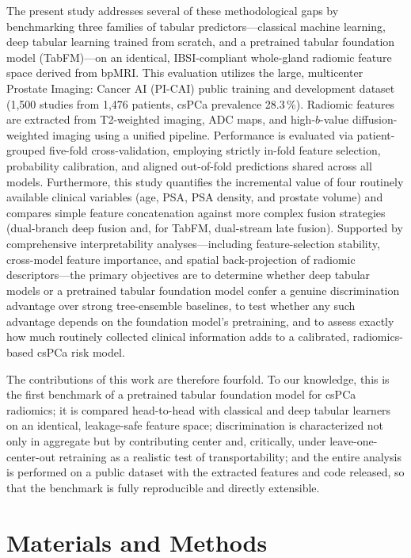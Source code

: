 \documentclass[11pt]{article}
\begin{document}
The present study addresses several of these methodological gaps by benchmarking three families of tabular predictors---classical machine learning, deep tabular learning trained from scratch, and a pretrained tabular foundation model (TabFM)---on an identical, IBSI-compliant whole-gland radiomic feature space derived from bpMRI. This evaluation utilizes the large, multicenter Prostate Imaging: Cancer AI (PI-CAI) public training and development dataset (1{,}500 studies from 1{,}476 patients, csPCa prevalence 28.3\,\%). Radiomic features are extracted from T2-weighted imaging, ADC maps, and high-$b$-value diffusion-weighted imaging using a unified pipeline. Performance is evaluated via patient-grouped five-fold cross-validation, employing strictly in-fold feature selection, probability calibration, and aligned out-of-fold predictions shared across all models. Furthermore, this study quantifies the incremental value of four routinely available clinical variables (age, PSA, PSA density, and prostate volume) and compares simple feature concatenation against more complex fusion strategies (dual-branch deep fusion and, for TabFM, dual-stream late fusion). Supported by comprehensive interpretability analyses—including feature-selection stability, cross-model feature importance, and spatial back-projection of radiomic descriptors—the primary objectives are to determine whether deep tabular models or a pretrained tabular foundation model confer a genuine discrimination advantage over strong tree-ensemble baselines, to test whether any such advantage depends on the foundation model's pretraining, and to assess exactly how much routinely collected clinical information adds to a calibrated, radiomics-based csPCa risk model.

The contributions of this work are therefore fourfold. To our knowledge, this is
the first benchmark of a pretrained tabular foundation model for csPCa radiomics;
it is compared head-to-head with classical and deep tabular learners on an
identical, leakage-safe feature space; discrimination is characterized not only in
aggregate but by contributing center and, critically, under leave-one-center-out
retraining as a realistic test of transportability; and the entire analysis is
performed on a public dataset with the extracted features and code released, so
that the benchmark is fully reproducible and directly extensible.

\section{Materials and Methods}
\label{sec:methods}
\end{document}

